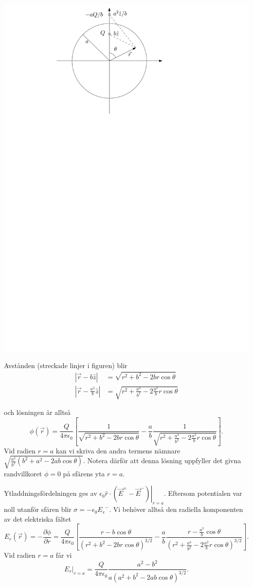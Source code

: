 \documentclass[%
oneside,                 %
final,                   %
10pt]{article}
\newenvironment{doconceexercise}{}{}
\begin{document}
\begin{doconceexercise}
\vspace{6mm}

\centerline{\includegraphics[width=0.5\linewidth]{fig-09-diffekv-veckanstal-spegling/spegling.pdf}}

\vspace{6mm}


Avstånden (streckade linjer i figuren) blir
\begin{align}
\left| \vec{r} - b\hat{z} \right| &= \sqrt{ r^2 + b^2 - 2 b r \cos\theta} \nonumber \\
\left| \vec{r} - \frac{a^2}{b}\hat{z} \right| &= \sqrt{ r^2 + \frac{a^4}{b^2} - 2 \frac{a^2}{b} r\cos\theta}
\end{align}

och lösningen är alltså 
$$
\phi(\vec{r}) = \frac{Q}{4\pi\epsilon_0} \left[ \frac{1}{\sqrt{r^2 + b^2 - 2 b r \cos\theta}} - \frac{a}{b} \frac{1}{\sqrt{r^2 + \frac{a^4}{b^2} - 2 \frac{a^2}{b} r\cos\theta}}\right].
$$
Vid radien $r=a$ kan vi skriva den andra termens nämnare $\sqrt{ \frac{a^2}{b^2} (b^2 + a^2 - 2 a b \cos\theta ) }$. Notera därför att denna lösning uppfyller det givna randvillkoret $\phi = 0$ på sfärens yta $r=a$.

Ytladdningsfördelningen ges av $\epsilon_0 \left. \hat{r} \cdot \left( \vec{E}^+ - \vec{E}^- \right) \right|_{r=a}$. Eftersom potentialen var noll utanför sfären blir $\sigma = -\epsilon_0 {E_r}^-$. Vi behöver alltså den radiella komponenten av det elektriska fältet
$$
E_r(\vec{r}) = -\frac{\partial \phi}{\partial r} = \frac{Q}{4\pi\epsilon_0} \left[ \frac{r - b\cos\theta}{(r^2 + b^2 - 2 b r\cos\theta)^{3/2}} - \frac{a}{b} \frac{r - \frac{a^2}{b}\cos\theta}{(r^2 + \frac{a^4}{b^2} - 2 \frac{a^2}{b}r\cos\theta)^{3/2}} \right].
$$
Vid radien $r=a$ får vi
$$
\left. E_r \right|_{r=a} = \frac{Q}{4\pi\epsilon_0} \frac{a^2 - b^2}{a(a^2 + b^2 - 2ab\cos\theta)^{3/2}}.
$$


\end{doconceexercise}
\end{document}
